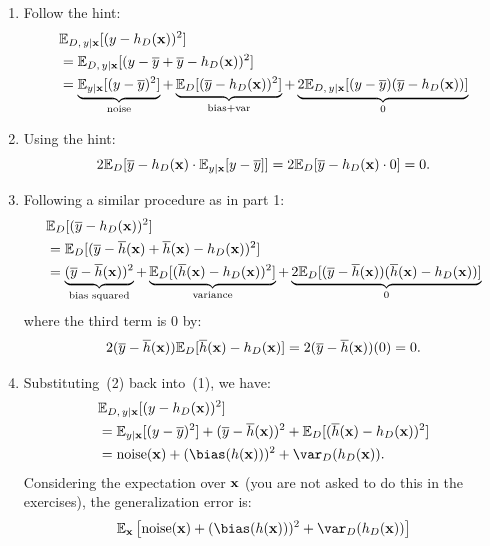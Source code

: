 \documentclass[12pt,letterpaper]{article}
\begin{document}
\begin{enumerate}
    \item Follow the hint: \begin{align*}
  & \mathbb{E}_{D, \, y|\mathbf{x}}[(y-h_D(\mathbf{x}))^2]\notag \\
  &= \mathbb{E}_{D, \, y|\mathbf{x}}[(y-\overline{y}+\overline{y}-h_D(\mathbf{x}))^2]\notag  \\
 &=\underbrace{\mathbb{E}_{y|\mathbf{x}}[(y-\overline{y})^2]}_\text{noise}
+\underbrace{\mathbb{E}_D[(\overline{y}-h_D(\mathbf{x}))^2]}_\text{bias+var}
+\underbrace{2\mathbb{E}_{D, \, y|\mathbf{x}}[(y-\overline{y})(\overline{y}-h_D(\mathbf{x}))]}_\text{0}
\end{align*}
\item Using the hint:
$$
2\mathbb{E}_D[\overline{y}-h_D(\mathbf{x})
\cdot \mathbb{E}_{y|\mathbf{x}}[y-\overline{y}]]
  = 2\mathbb{E}_D[\overline{y}-h_D(\mathbf{x})
\cdot 0] = 0.$$
\item
Following a similar procedure as in part 1:
\begin{align*}
 & \mathbb{E}_D[(\overline{y}-h_D(\mathbf{x}))^2]\notag \\
 &= \mathbb{E}_D[(\overline{y}-\overline{h}(\mathbf{x})+\overline{h}(\mathbf{x})-h_D(\mathbf{x}))^2] \notag \\
 &= \underbrace{(\overline{y}-\overline{h}(\mathbf{x}))^2}_\text{bias squared}+\underbrace{\mathbb{E}_D[(\overline{h}(\mathbf{x})-h_D(\mathbf{x}))^2]}_\text{variance}
+\underbrace{2\mathbb{E}_D[(\overline{y}-\overline{h}(\mathbf{x}))(\overline{h}(\mathbf{x})-h_D(\mathbf{x}))]}_\text{0}
\end{align*}
where the third term is 0 by:
$$
2(\overline{y}-\overline{h}(\mathbf{x}))
\mathbb{E}_D[\overline{h}(\mathbf{x})-h_D(\mathbf{x})]
= 2(\overline{y}-\overline{h}(\mathbf{x}))(0) = 0.
$$
\item
Substituting~(2) back into~(1), we have:
%
\begin{align*}
&  \mathbb{E}_{D, \, y|\boldx}[(y-h_D(\boldx))^2] \\
&= \mathbb{E}_{y|\boldx}[(y-\overline{y})^2]+
(\overline{y}-\overline{h}(\boldx))^2
+
\mathbb{E}_D[(\overline{h}(\boldx)-h_D(\boldx))^2]
\\
&=\mbox{noise}(\boldx)+(\bias(h(\boldx)))^2
+\var_D(h_D(\boldx)).
\end{align*}
Considering the expectation over $\mathbf{x}$ (you are not asked to do this in the exercises), the
generalization error is:
%
\begin{align*}
\mathbb{E}_{\boldx}\left[\mbox{noise}(\boldx)+
(\bias(h(\boldx)))^2
    +\var_D(h_D(\boldx))\right]
  \end{align*}
\end{enumerate}
\end{document}
